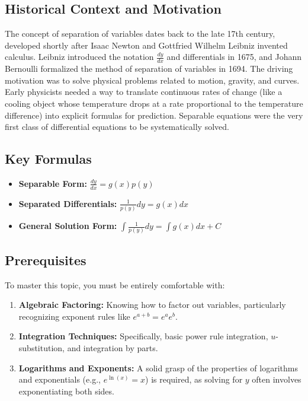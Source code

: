 \documentclass[11pt]{article}
\begin{document}
\subsection{Historical Context and Motivation}
The concept of separation of variables dates back to the late 17th century, developed shortly after Isaac Newton and Gottfried Wilhelm Leibniz invented calculus. Leibniz introduced the notation $\frac{dy}{dx}$ and differentials in 1675, and Johann Bernoulli formalized the method of separation of variables in 1694. The driving motivation was to solve physical problems related to motion, gravity, and curves. Early physicists needed a way to translate continuous rates of change (like a cooling object whose temperature drops at a rate proportional to the temperature difference) into explicit formulas for prediction. Separable equations were the very first class of differential equations to be systematically solved.

\subsection{Key Formulas}
\begin{itemize}
    \item \textbf{Separable Form:} $\frac{dy}{dx} = g(x) p(y)$
    \item \textbf{Separated Differentials:} $\frac{1}{p(y)} dy = g(x) dx$
    \item \textbf{General Solution Form:} $\int \frac{1}{p(y)} dy = \int g(x) dx + C$ 
\end{itemize}

\subsection{Prerequisites}
To master this topic, you must be entirely comfortable with:
\begin{enumerate}
    \item \textbf{Algebraic Factoring:} Knowing how to factor out variables, particularly recognizing exponent rules like $e^{a+b} = e^a e^b$.
    \item \textbf{Integration Techniques:} Specifically, basic power rule integration, $u$-substitution, and integration by parts.
    \item \textbf{Logarithms and Exponents:} A solid grasp of the properties of logarithms and exponentials (e.g., $e^{\ln(x)} = x$) is required, as solving for $y$ often involves exponentiating both sides.
\end{enumerate}
\end{document}
